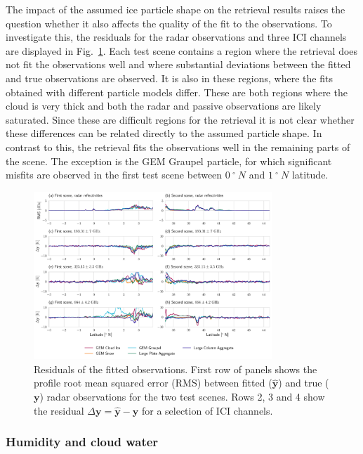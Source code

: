 \documentclass[journal abbreviation, manuscript]{copernicus}
\begin{document}
The impact of the assumed ice particle shape on the retrieval results raises the
question whether it also affects the quality of the fit to the observations. To
investigate this, the residuals for the radar observations and three ICI
channels are displayed in Fig.~\ref{fig:misfit}. Each test scene contains a
region where the retrieval does not fit the observations well and where
substantial deviations between the fitted and true observations are observed. It
is also in these regions, where the fits obtained with different particle models
differ. These are both regions where the cloud is very thick and both the radar
and passive observations are likely saturated. Since these are difficult regions
for the retrieval it is not clear whether these differences can be related
directly to the assumed particle shape. In contrast to this, the retrieval fits
the observations well in the remaining parts of the scene. The exception is the
GEM Graupel particle, for which significant misfits are observed in the first
test scene between $0\ \unit{^{\circ}\ N}$ and $1\ \unit{^{\circ}\ N}$ latitude.

\begin{figure}[!h]
\centering
\includegraphics[width = 0.8\textwidth]{../plots/misfits}
\caption{Residuals of the fitted observations. First row of panels shows the
  profile root mean squared error (RMS) between fitted ($\hat{\mathbf{y}}$) and
  true ($\mathbf{y}$) radar observations for the two test scenes. Rows 2, 3 and
  4 show the residual $\Delta \mathbf{y} = \hat{\mathbf{y}} - \mathbf{y}$ for a
  selection of ICI channels.}
\label{fig:misfit}
\end{figure}

\subsubsection{Humidity and cloud water}
\end{document}

